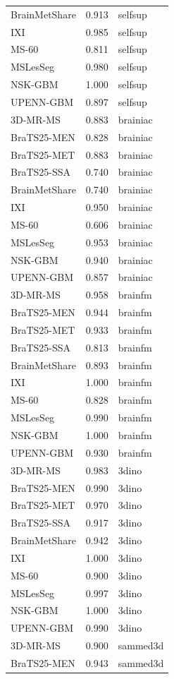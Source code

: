 \begin{tabular}{lrl}
BrainMetShare & 0.913 & selfsup \\
IXI & 0.985 & selfsup \\
MS-60 & 0.811 & selfsup \\
MSLesSeg & 0.980 & selfsup \\
NSK-GBM & 1.000 & selfsup \\
UPENN-GBM & 0.897 & selfsup \\
3D-MR-MS & 0.883 & brainiac \\
BraTS25-MEN & 0.828 & brainiac \\
BraTS25-MET & 0.883 & brainiac \\
BraTS25-SSA & 0.740 & brainiac \\
BrainMetShare & 0.740 & brainiac \\
IXI & 0.950 & brainiac \\
MS-60 & 0.606 & brainiac \\
MSLesSeg & 0.953 & brainiac \\
NSK-GBM & 0.940 & brainiac \\
UPENN-GBM & 0.857 & brainiac \\
3D-MR-MS & 0.958 & brainfm \\
BraTS25-MEN & 0.944 & brainfm \\
BraTS25-MET & 0.933 & brainfm \\
BraTS25-SSA & 0.813 & brainfm \\
BrainMetShare & 0.893 & brainfm \\
IXI & 1.000 & brainfm \\
MS-60 & 0.828 & brainfm \\
MSLesSeg & 0.990 & brainfm \\
NSK-GBM & 1.000 & brainfm \\
UPENN-GBM & 0.930 & brainfm \\
3D-MR-MS & 0.983 & 3dino \\
BraTS25-MEN & 0.990 & 3dino \\
BraTS25-MET & 0.970 & 3dino \\
BraTS25-SSA & 0.917 & 3dino \\
BrainMetShare & 0.942 & 3dino \\
IXI & 1.000 & 3dino \\
MS-60 & 0.900 & 3dino \\
MSLesSeg & 0.997 & 3dino \\
NSK-GBM & 1.000 & 3dino \\
UPENN-GBM & 0.990 & 3dino \\
3D-MR-MS & 0.900 & sammed3d \\
BraTS25-MEN & 0.943 & sammed3d \\

\end{tabular}

